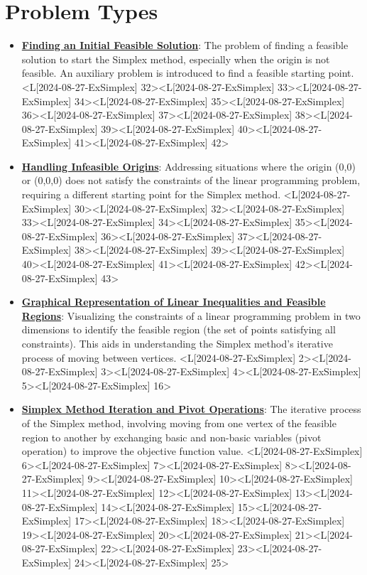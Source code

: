 \documentclass{article}%
\begin{document}
\section{Problem Types}%
\label{sec:ProblemTypes}%
\begin{itemize}[[leftmargin=*]]%
\item \href{https://www.math.purdue.edu/~yipn/421/2024-08-27-ExSimplex.pdf#page=32}{\textbf{Finding an Initial Feasible Solution}}: The problem of finding a feasible solution to start the Simplex method, especially when the origin is not feasible. An auxiliary problem is introduced to find a feasible starting point. <L[2024-08-27-ExSimplex] 32><L[2024-08-27-ExSimplex] 33><L[2024-08-27-ExSimplex] 34><L[2024-08-27-ExSimplex] 35><L[2024-08-27-ExSimplex] 36><L[2024-08-27-ExSimplex] 37><L[2024-08-27-ExSimplex] 38><L[2024-08-27-ExSimplex] 39><L[2024-08-27-ExSimplex] 40><L[2024-08-27-ExSimplex] 41><L[2024-08-27-ExSimplex] 42>%
\item \href{https://www.math.purdue.edu/~yipn/421/2024-08-27-ExSimplex.pdf#page=30}{\textbf{Handling Infeasible Origins}}: Addressing situations where the origin (0,0) or (0,0,0) does not satisfy the constraints of the linear programming problem, requiring a different starting point for the Simplex method. <L[2024-08-27-ExSimplex] 30><L[2024-08-27-ExSimplex] 32><L[2024-08-27-ExSimplex] 33><L[2024-08-27-ExSimplex] 34><L[2024-08-27-ExSimplex] 35><L[2024-08-27-ExSimplex] 36><L[2024-08-27-ExSimplex] 37><L[2024-08-27-ExSimplex] 38><L[2024-08-27-ExSimplex] 39><L[2024-08-27-ExSimplex] 40><L[2024-08-27-ExSimplex] 41><L[2024-08-27-ExSimplex] 42><L[2024-08-27-ExSimplex] 43>%
\item \href{https://www.math.purdue.edu/~yipn/421/2024-08-27-ExSimplex.pdf#page=2}{\textbf{Graphical Representation of Linear Inequalities and Feasible Regions}}: Visualizing the constraints of a linear programming problem in two dimensions to identify the feasible region (the set of points satisfying all constraints). This aids in understanding the Simplex method's iterative process of moving between vertices. <L[2024-08-27-ExSimplex] 2><L[2024-08-27-ExSimplex] 3><L[2024-08-27-ExSimplex] 4><L[2024-08-27-ExSimplex] 5><L[2024-08-27-ExSimplex] 16>%
\item \href{https://www.math.purdue.edu/~yipn/421/2024-08-27-ExSimplex.pdf#page=6}{\textbf{Simplex Method Iteration and Pivot Operations}}: The iterative process of the Simplex method, involving moving from one vertex of the feasible region to another by exchanging basic and non-basic variables (pivot operation) to improve the objective function value. <L[2024-08-27-ExSimplex] 6><L[2024-08-27-ExSimplex] 7><L[2024-08-27-ExSimplex] 8><L[2024-08-27-ExSimplex] 9><L[2024-08-27-ExSimplex] 10><L[2024-08-27-ExSimplex] 11><L[2024-08-27-ExSimplex] 12><L[2024-08-27-ExSimplex] 13><L[2024-08-27-ExSimplex] 14><L[2024-08-27-ExSimplex] 15><L[2024-08-27-ExSimplex] 17><L[2024-08-27-ExSimplex] 18><L[2024-08-27-ExSimplex] 19><L[2024-08-27-ExSimplex] 20><L[2024-08-27-ExSimplex] 21><L[2024-08-27-ExSimplex] 22><L[2024-08-27-ExSimplex] 23><L[2024-08-27-ExSimplex] 24><L[2024-08-27-ExSimplex] 25>%

\end{itemize}
\end{document}
